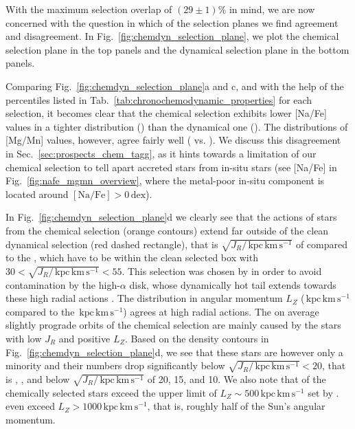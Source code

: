 \documentclass[fleqn,usenatbib]{mnras}
\newcommand{\dex}{\,\mathrm{dex}}	%
\newcommand{\kpckms}{\,\mathrm{kpc\,km\,s^{-1}}}	%
\begin{document}

With the maximum selection overlap of $(29\pm1)\%$ in mind, we are now concerned with the question in which of the selection planes we find agreement and disagreement. In Fig.~\ref{fig:chemdyn_selection_plane}, we plot the chemical selection plane in the top panels and the dynamical selection plane in the bottom panels.

Comparing Fig.~\ref{fig:chemdyn_selection_plane}a and c, and with the help of the percentiles listed in Tab.~\ref{tab:chronochemodynamic_properties} for each selection, it becomes clear that the chemical selection exhibits lower [Na/Fe] values in a tighter distribution () than the dynamical one (). The distributions of [Mg/Mn] values, however, agree fairly well ( vs. ). We discuss this disagreement in Sec.~\ref{sec:prospects_chem_tagg}, as it hints towards a limitation of our chemical selection to tell apart accreted stars from in-situ stars (see [Na/Fe] in Fig.~\ref{fig:nafe_mgmn_overview}, where the metal-poor in-situ component is located around $\mathrm{[Na/Fe]} > 0 \dex$).

In Fig.~\ref{fig:chemdyn_selection_plane}d we clearly see that the actions of stars from the chemical selection (orange contours) extend far outside of the clean dynamical selection (red dashed rectangle), that is $\sqrt{J_R / \kpckms}$ of  compared to the , which have to be within the clean selected box with $30 < \sqrt{J_R / \kpckms} < 55$. This selection was chosen by \citet{Feuillet2021} in order to avoid contamination by the high-$\alpha$ disk, whose dynamically hot tail extends towards these high radial actions \citep[e.g.][]{Feuillet2020, Das2020}. The distribution in angular momentum $L_Z$ ($\kpckms$ compared to the $\kpckms$) agrees at high radial actions. The on average slightly prograde orbits of the chemical selection are mainly caused by the stars with low $J_R$ and positive $L_Z$. Based on the density contours in Fig.~\ref{fig:chemdyn_selection_plane}d, we see that these stars are however only a minority and their numbers drop significantly below $\sqrt{J_R / \kpckms} < 20$, that is , , and  below $\sqrt{J_R / \kpckms}$ of 20, 15, and 10. We also note that  of the chemically selected stars exceed the upper limit of $L_Z \sim 500\kpckms$ set by \citet{Feuillet2021}.  even exceed $L_Z > 1000\kpckms$, that is, roughly half of the Sun's angular momentum.
\end{document}
